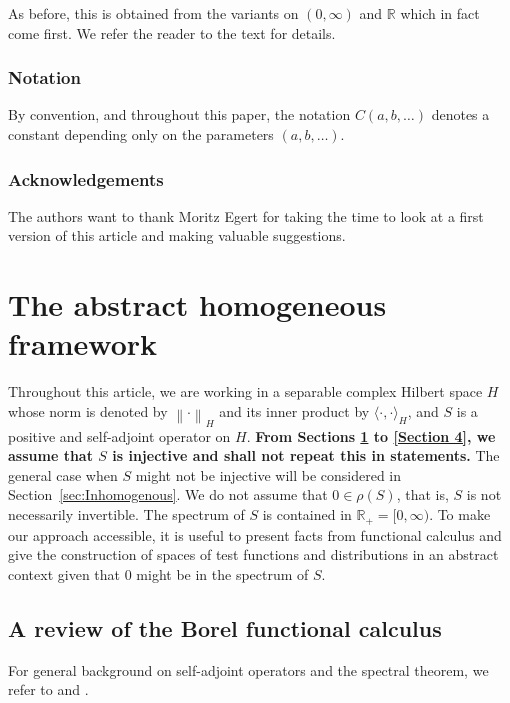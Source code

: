 \documentclass[11pt, letterpaper]{amsart}
\theoremstyle{definition}
\theoremstyle{remark}
\numberwithin{equation}{section}
\begin{document}
As before, this is obtained from the variants on $(0,\infty)$ and $\mathbb{R}$ which in fact come first.  We refer the reader to the text for details.  

\subsubsection*{\textbf{Notation}}

By convention, and throughout this paper, the notation $C(a,b,\ldots)$ denotes a constant depending only on the parameters $(a,b,\ldots)$. 

\subsubsection*{\textbf{Acknowledgements}}
The authors want to thank Moritz Egert for taking the time to look at  a first version of this article and making valuable suggestions.





\section{The abstract homogeneous framework}\label{Section 2}
Throughout this article, we are working in a separable complex Hilbert space $H$ whose norm is denoted by $\left \| \cdot \right \|_H$ and its inner product by $\langle \cdot, \cdot \rangle_H$, and $S$ is a positive and self-adjoint operator on  $H$. \textbf{From Sections \ref{Section 2} to \ref{Section 4}, we assume that $S$ is  injective and shall not repeat this in statements.} The general case when $S$ might not be injective will be considered in Section~\ref{sec:Inhomogenous}. We do not assume that $0 \in \rho(S)$,  that is,  $S$ is not necessarily invertible. The spectrum of $S$ is contained in $\mathbb{R}_+=[0,\infty)$. To make our approach accessible, it is useful to present facts from functional calculus and give the construction of spaces of test functions and distributions in an abstract context given that 0 might be in the spectrum of $S$.
\subsection{A review of the Borel functional calculus}\label{Section: calcul bor}
For general background on self-adjoint operators and the spectral theorem, we refer to \cite{reed1980methods} and \cite{davies1995spectral}.
\end{document}
